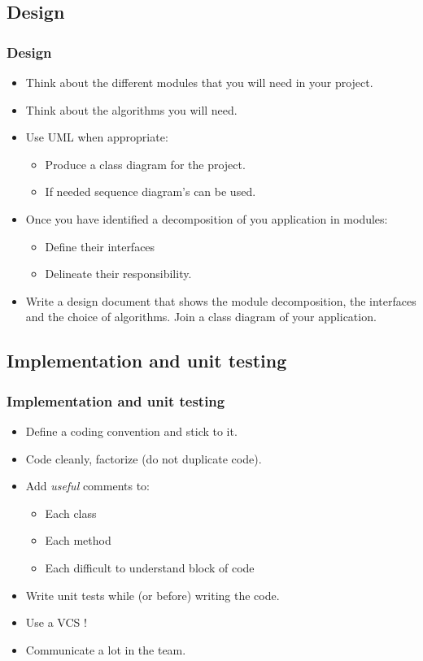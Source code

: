 \documentclass[10pt]{beamer}
\begin{document}
\subsection{Design}
\begin{frame}
  \frametitle{Design}
  \begin{itemize}
  \item Think about the different modules that you will need in your project.
  \item Think about the algorithms you will need.
  \item Use UML when appropriate:
    \begin{itemize}
      \item Produce a class diagram for the project.
      \item If needed sequence diagram's can be used.
    \end{itemize}
  \item Once you have identified a decomposition of you application in modules:
    \begin{itemize}
    \item Define their interfaces
    \item Delineate their responsibility.
    \end{itemize}
  \item Write a design document that shows the module decomposition, the
    interfaces and the choice of algorithms. Join a class diagram of your application.
  \end{itemize}
\end{frame}

\subsection{Implementation and unit testing}
\begin{frame}
  \frametitle{Implementation and unit testing}
  \begin{itemize}
  \item Define a coding convention and stick to it.
  \item Code cleanly, factorize (do not duplicate code).
  \item Add \emph{useful} comments to:
    \begin{itemize}
    \item Each class
    \item Each method
    \item Each difficult to understand block of code
    \end{itemize}
  \item Write unit tests while (or before) writing the code.
  \item Use a VCS !
  \item Communicate a lot in the team.
  \end{itemize}
\end{frame}
\end{document}
